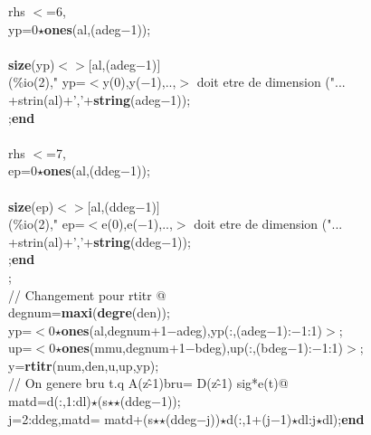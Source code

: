 {\begin{flushleft}
{ rhs $<$=6, \\ 
\cmarg \hspace{0.8cm}yp=0$\star${\bf ones}(al,(adeg$-$1));\\ 
 \\ 
\cmarg \hspace{0.5cm}{\bf if} {\bf size}(yp)$<$$>$$[$al,(adeg$-$1)$]$\\ 
\cmarg \hspace{1.0cm}{\bf write}(\%io(2)," yp=$<$y(0),y($-$1),..,$>$ doit etre de dimension ("...\\ 
\cmarg \hspace{1.0cm}+strin(al)+','+{\bf string}(adeg$-$1));\\ 
\cmarg \hspace{1.0cm}{\bf return};{\bf end}\\ 
\\ 
 rhs $<$=7, \\ 
\cmarg \hspace{0.8cm}ep=0$\star${\bf ones}(al,(ddeg$-$1));\\ 
 \\ 
\cmarg \hspace{0.5cm}{\bf if} {\bf size}(ep)$<$$>$$[$al,(ddeg$-$1)$]$\\ 
\cmarg \hspace{1.0cm}{\bf write}(\%io(2)," ep=$<$e(0),e($-$1),..,$>$ doit etre de dimension ("...\\ 
\cmarg \hspace{1.0cm}+strin(al)+','+{\bf string}(ddeg$-$1));\\ 
\cmarg \hspace{1.0cm}{\bf return};{\bf end}\\ 
;\\ 
\cmarg \verb@// Changement pour rtitr @\\ 
\cmarg degnum={\bf maxi}({\bf degre}(den));\\ 
\cmarg yp=$<$0$\star${\bf ones}(al,degnum+1$-$adeg),yp(:,(adeg$-$1):$-$1:1)$>$;\\ 
\cmarg up=$<$0$\star${\bf ones}(mmu,degnum+1$-$bdeg),up(:,(bdeg$-$1):$-$1:1)$>$;\\ 
\cmarg y={\bf rtitr}(num,den,u,up,yp);\\ 
\cmarg \verb@// On genere bru t.q A(z\^-1)bru= D(z\^-1) sig*e(t)@\\ 
\cmarg matd=d(:,1:dl)$\star$(s$\star$$\star$(ddeg$-$1));\\ 
 j=2:ddeg,matd= matd+(s$\star$$\star$(ddeg$-$j))$\star$d(:,1+(j$-$1)$\star$dl:j$\star$dl);{\bf end}\\ 
}
\end{flushleft}}
